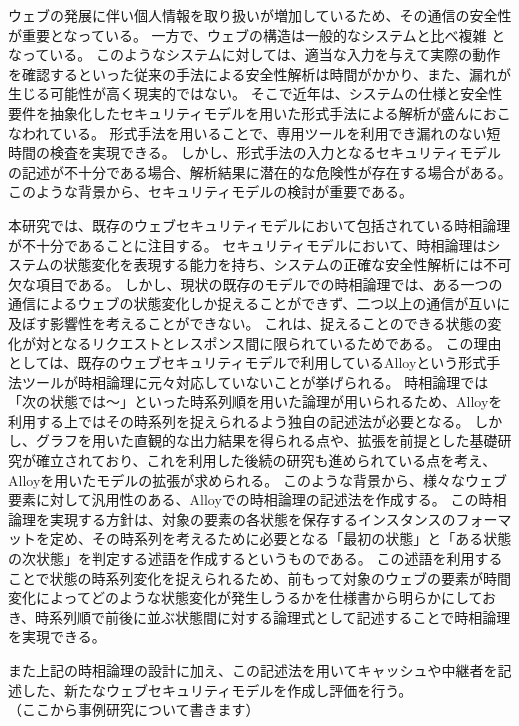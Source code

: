 \documentclass[12pt,a4paper]{jbook}
\begin{document}
ウェブの発展に伴い個人情報を取り扱いが増加しているため、その通信の安全性が重要となっている。
一方で、ウェブの構造は一般的なシステムと比べ複雑
\color{red}
となっている。
このようなシステムに対しては、適当な入力を与えて実際の動作を確認するといった従来の手法による安全性解析は時間がかかり、また、漏れが生じる可能性が高く現実的ではない。
そこで近年は、システムの仕様と安全性要件を抽象化したセキュリティモデルを用いた形式手法による解析が盛んにおこなわれている。
形式手法を用いることで、専用ツールを利用でき漏れのない短時間の検査を実現できる。
\color{black}
しかし、形式手法の入力となるセキュリティモデルの記述が不十分である場合、解析結果に潜在的な危険性が存在する場合がある。
このような背景から、セキュリティモデルの検討が重要である。

本研究では、既存のウェブセキュリティモデルにおいて包括されている時相論理が不十分であることに注目する。
セキュリティモデルにおいて、時相論理はシステムの状態変化を表現する能力を持ち、システムの正確な安全性解析には不可欠な項目である。
しかし、現状の既存のモデルでの時相論理では、ある一つの通信によるウェブの状態変化しか捉えることができず、二つ以上の通信が互いに及ぼす影響性を考えることができない。
これは、捉えることのできる状態の変化が対となるリクエストとレスポンス間に限られているためである。
\color{red}
この理由としては、既存のウェブセキュリティモデルで利用しているAlloyという形式手法ツールが時相論理に元々対応していないことが挙げられる。
時相論理では「次の状態では～」といった時系列順を用いた論理が用いられるため、Alloyを利用する上ではその時系列を捉えられるよう独自の記述法が必要となる。
しかし、グラフを用いた直観的な出力結果を得られる点や、拡張を前提とした基礎研究が確立されており、これを利用した後続の研究も進められている点を考え、Alloyを用いたモデルの拡張が求められる。
このような背景から、様々なウェブ要素に対して汎用性のある、Alloyでの時相論理の記述法を作成する。
この時相論理を実現する方針は、対象の要素の各状態を保存するインスタンスのフォーマットを定め、その時系列を考えるために必要となる「最初の状態」と「ある状態の次状態」を判定する述語を作成するというものである。
この述語を利用することで状態の時系列変化を捉えられるため、前もって対象のウェブの要素が時間変化によってどのような状態変化が発生しうるかを仕様書から明らかにしておき、時系列順で前後に並ぶ状態間に対する論理式として記述することで時相論理を実現できる。
\color{black}

また上記の時相論理の設計に加え、この記述法を用いてキャッシュや中継者を記述した、新たなウェブセキュリティモデルを作成し評価を行う。
\\（ここから事例研究について書きます）
\end{document}
